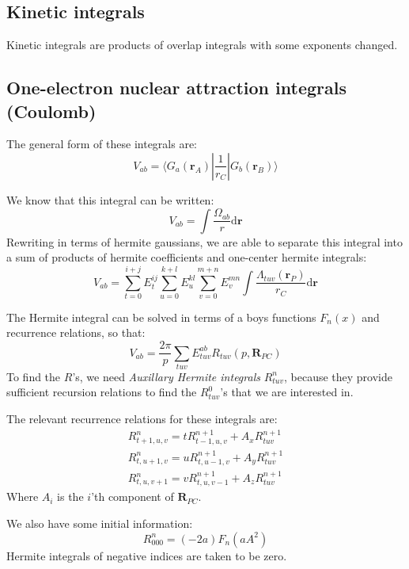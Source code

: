 \documentclass[a4paper,10pt, twocolumn, pre]{revtex4}
\newcommand{\rvec}{\mathbf{r}}
\newcommand{\dd}{\mathrm{d}}
\newcommand{\mb}{\mathbf}
\newcommand{\sandwich}[3]{\langle {#1}|{#2}|{#3}\rangle}
\begin{document}
\subsection{Kinetic integrals}

Kinetic integrals are products of overlap integrals with some exponents changed.

\subsection{One-electron nuclear attraction integrals (Coulomb)}
The general form of these integrals are:
\begin{equation}
	V_{ab} = \sandwich{G_a(\rvec_A)}{\frac{1}{r_C}}{G_b(\rvec_B)}
\end{equation}

We know that this integral can be written:
\begin{equation}
	V_{ab} = \int \frac{\Omega_{ab}}{r}\dd \rvec  
\end{equation}
Rewriting in terms of hermite gaussians, we are able to separate this integral into a sum of products of hermite coefficients and one-center hermite integrals:
\begin{equation}
	V_{ab} = \sum_{t=0}^{i+j}E_{t}^{ij}\sum_{u=0}^{k+l}E_{u}^{kl}\sum_{v=0}^{m+n}E_{v}^{mn} \int \frac{\Lambda_{tuv}(\rvec_P)}{r_C} \dd \rvec
\end{equation}

The Hermite integral can be solved in terms of a boys functions $F_n(x)$ and recurrence relations, so that:
\begin{equation}
	V_{ab} = \frac{2\pi}{p}\sum_{tuv} E_{tuv}^{ab} R_{tuv}(p, \mb{R}_{PC})
\end{equation}
To find the $R$'s, we need \emph{Auxillary Hermite integrals} $R_{tuv}^n$, because they provide sufficient recursion relations to find the $R_{tuv}^0$'s that we are interested in.

The relevant recurrence relations for these integrals are:
\begin{align}
R_{t+1, u, v}^n = tR_{t-1, u, v}^{n+1} + A_xR_{tuv}^{n+1} \\
R_{t, u+1, v}^n = uR_{t, u-1, v}^{n+1} + A_yR_{tuv}^{n+1} \\
R_{t, u, v+1}^n = vR_{t, u, v-1}^{n+1} + A_zR_{tuv}^{n+1}
\end{align}
Where $A_i$ is the $i$'th component of $\mb{R}_{PC}$.

We also have some initial information:
\begin{equation}
	R_{000}^n = (-2a)F_n(aA^2)
\end{equation}
Hermite integrals of negative indices are taken to be zero.
\end{document}
